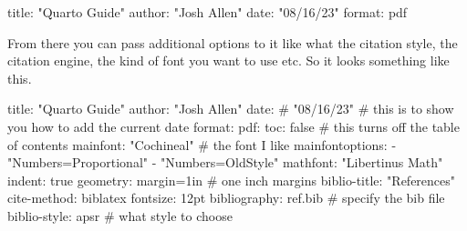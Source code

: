 \documentclass[
  letterpaper,
  DIV=11,
  numbers=noendperiod,
  oneside]{scrreprt}
\newenvironment{Shaded}{\begin{snugshade}}{\end{snugshade}}
\newcommand{\AttributeTok}[1]{\textcolor[rgb]{0.40,0.45,0.13}{#1}}
\newcommand{\CharTok}[1]{\textcolor[rgb]{0.13,0.47,0.30}{#1}}
\newcommand{\CommentTok}[1]{\textcolor[rgb]{0.37,0.37,0.37}{#1}}
\newcommand{\FunctionTok}[1]{\textcolor[rgb]{0.28,0.35,0.67}{#1}}
\newcommand{\KeywordTok}[1]{\textcolor[rgb]{0.00,0.23,0.31}{#1}}
\newcommand{\StringTok}[1]{\textcolor[rgb]{0.13,0.47,0.30}{#1}}
\begin{document}
\begin{Shaded}
\begin{Highlighting}[]
\FunctionTok{title}\KeywordTok{:}\AttributeTok{ }\StringTok{"Quarto Guide"}
\FunctionTok{author}\KeywordTok{:}\AttributeTok{ }\StringTok{"Josh Allen"}
\FunctionTok{date}\KeywordTok{:}\AttributeTok{  }\StringTok{"08/16/23"}
\FunctionTok{format}\KeywordTok{:}\AttributeTok{ pdf}
\end{Highlighting}
\end{Shaded}

From there you can pass additional options to it like what the citation
style, the citation engine, the kind of font you want to use etc. So it
looks something like this.

\begin{Shaded}
\begin{Highlighting}[]
\FunctionTok{title}\KeywordTok{:}\AttributeTok{ }\StringTok{"Quarto Guide"}
\FunctionTok{author}\KeywordTok{:}\AttributeTok{ }\StringTok{"Josh Allen"}
\FunctionTok{date}\KeywordTok{:}\CommentTok{ \# "08/16/23" \# this is to show you how to add the current date}
\FunctionTok{format}\KeywordTok{:}
\AttributeTok{  }\FunctionTok{pdf}\KeywordTok{:}
\AttributeTok{    }\FunctionTok{toc}\KeywordTok{:}\AttributeTok{ }\CharTok{false}\CommentTok{ \# this turns off the table of contents}
\AttributeTok{    }\FunctionTok{mainfont}\KeywordTok{:}\AttributeTok{ }\StringTok{"Cochineal"}\CommentTok{ \# the font I like}
\AttributeTok{    }\FunctionTok{mainfontoptions}\KeywordTok{:}\AttributeTok{ }
\AttributeTok{      }\KeywordTok{{-}}\AttributeTok{ }\StringTok{"Numbers=Proportional"}
\AttributeTok{      }\KeywordTok{{-}}\AttributeTok{ }\StringTok{"Numbers=OldStyle"}
\AttributeTok{    }\FunctionTok{mathfont}\KeywordTok{:}\AttributeTok{ }\StringTok{"Libertinus Math"}
\AttributeTok{    }\FunctionTok{indent}\KeywordTok{:}\AttributeTok{ }\CharTok{true}
\AttributeTok{    }\FunctionTok{geometry}\KeywordTok{:}\AttributeTok{ margin=1in}\CommentTok{ \# one inch margins }
\AttributeTok{    }\FunctionTok{biblio{-}title}\KeywordTok{:}\AttributeTok{ }\StringTok{"References"}
\AttributeTok{    }\FunctionTok{cite{-}method}\KeywordTok{:}\AttributeTok{ biblatex}
\FunctionTok{fontsize}\KeywordTok{:}\AttributeTok{ 12pt}
\FunctionTok{bibliography}\KeywordTok{:}\AttributeTok{ ref.bib}\CommentTok{ \# specify the bib file }
\FunctionTok{biblio{-}style}\KeywordTok{:}\AttributeTok{ apsr}\CommentTok{ \# what style to choose }
\end{Highlighting}
\end{Shaded}
\end{document}
